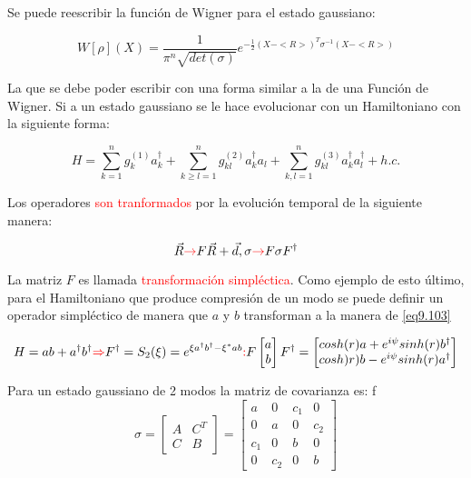 \documentclass{book}
\begin{document}
Se puede reescribir la función de Wigner para el estado gaussiano:

\begin{equation}\label{eq9.101}W[\rho](X)=\frac{1}{\pi^n \sqrt{det(\sigma)}}e^{-\frac{1}{2}(X-<R>)^T\sigma^{-1}(X-<R>)}\end{equation}

La que se debe poder escribir con una forma similar a la de una Función de Wigner. Si a un estado gaussiano se le hace evolucionar con un Hamiltoniano con la siguiente forma:

\begin{equation}\label{eq9.102}H=\sum_{k=1}^n g_k^{(1)} a_k^\dag +\sum_{k\geq l=1}^n g_{kl}^{(2)}a_k^\dag a_l+\sum_{k,l=1}^n g_{kl}^{(3)}a_k^\dag a_l^\dag +h.c.\end{equation}

Los operadores \textcolor{red}{son tranformados} por la evolución temporal de la siguiente manera:

\begin{equation}\label{eq9.103}\vec{R}\textcolor{red}{\rightarrow}F\vec{R}+\vec{d}, \sigma\textcolor{red}{\rightarrow} F\sigma F^\dag\end{equation}

La matriz $F$ es llamada \textcolor{red}{transformación simpléctica}. Como ejemplo de esto último, para el Hamiltoniano que produce compresión de un modo se puede definir un operador simpléctico de manera que $a$ y $b$ transforman a la manera de \ref{eq9.103}

\begin{equation}\label{eq9.104}H=ab+a^\dag b^\dag \textcolor{red}{\Rightarrow} F^\dag=S_2(\xi)=e^{\xi a^\dag b^\dag-\xi^* ab}\textcolor{red}{:}F\begin{bmatrix} a\\ b\end{bmatrix}F^\dag= \begin{bmatrix}cosh(r)a+e^{i\psi} sinh(r)b^\dag \\ cosh)r)b-e^{i\psi}sinh(r)a^\dag \end{bmatrix}\end{equation}

Para un estado gaussiano de 2 modos la matriz de covarianza es:
f
\begin{equation}\label{eq9.105}\sigma=\begin{bmatrix} A& C^T\\ C& B\end{bmatrix}=\begin{bmatrix} a&0&c_1&0 \\ 0&a&0&c_2 \\ c_1&0&b&0 \\ 0&c_2&0&b \end{bmatrix}\end{equation}
\end{document}
